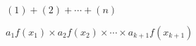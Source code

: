 \documentclass{article}
\providecommand{\Define}[2]{%
		\providecommand{#1}{}\renewcommand{#1}[1]{#2}%
	}
\providecommand{\List}[3]{%
		{#1{1}}#2{#1{2}}#2\cdots#2{#1{#3}}%
	}
\providecommand{\Listn}[3]{%
		\Define\f{#2}\Define{#1}{\List{\f}{#3}{##1}}%
	}
\begin{document}
\Listn{\sumup}{(#1)}{+}
$\sumup{n}$

\Listn{\sumupaf}{a_{#1}f(x_{#1})}{\times}
$\sumupaf{k+1}$
\end{document}

